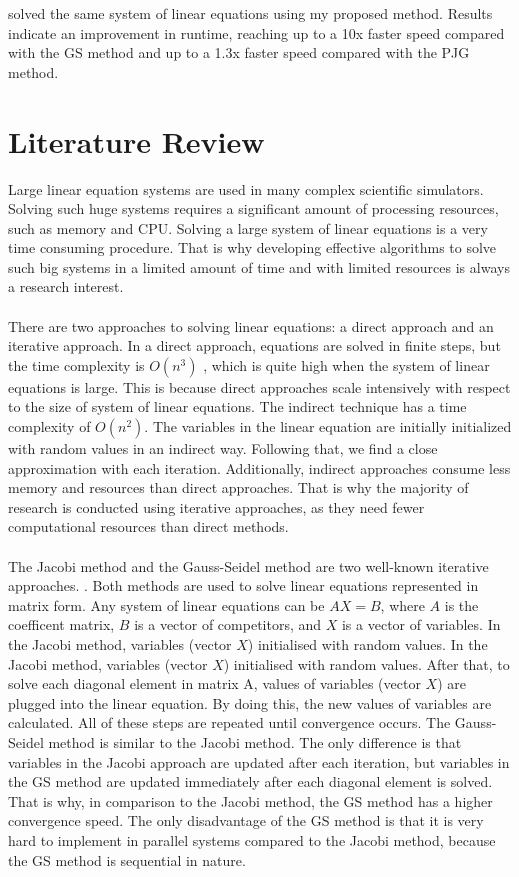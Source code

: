 \documentclass[11pt]{article}       %
\begin{document}
solved the same system of linear equations using my proposed method. Results indicate an improvement in runtime, reaching up to a 10x faster speed compared with the GS method and up to a 1.3x faster speed compared with the PJG method.


\section{Literature Review} \label{litrev}

Large linear equation systems are used in many complex scientific simulators. Solving such huge systems requires a significant amount of processing resources, such as memory and CPU. Solving a large system of linear equations is a very time consuming procedure. That is why developing effective algorithms to solve such big systems in a limited amount of time and with limited resources is always a research interest.
\\
\\
There are two approaches to solving linear equations: a direct approach and an iterative approach. In a direct approach,  equations are solved in finite steps, but the time complexity is $O(n^{3})$ \cite{numerical-mathematics}, which is quite high when the system of linear equations is large. This is because direct approaches scale intensively with respect to the size of system of linear equations. The indirect technique has a time complexity of $O(n^2)$. The variables in the linear equation are initially initialized with random values in an indirect way. Following that, we find a close approximation with each iteration. Additionally, indirect approaches consume less memory and resources than direct approaches. That is why the majority of research is conducted using iterative approaches, as they need fewer computational resources than direct methods.
\\
\\
The Jacobi method and the Gauss-Seidel method are two well-known iterative approaches. \cite{hageman2016applied}. Both methods are used to solve linear equations represented in matrix form. Any system of linear equations can be  $AX = B$, where $A$ is the coefficent matrix, $B$ is a vector of competitors, and $X$ is a vector of variables. In the Jacobi method, variables (vector $X$) initialised with random values. In the Jacobi method, variables (vector $X$) initialised with random values. After that, to solve each diagonal element in matrix A, values of variables (vector $X$) are plugged into the linear equation.  By doing this, the new values of variables are calculated.  All of these steps are repeated until convergence occurs. The   Gauss-Seidel method is similar to the Jacobi method. The only difference is that variables in the Jacobi approach are updated after each iteration, but variables in the GS method are updated immediately after each diagonal element is solved. That is why, in comparison to the Jacobi method, the GS method has a higher convergence speed. The only disadvantage of the GS method is that it is very hard to implement in parallel systems compared to the Jacobi method, because the GS method is sequential in nature.
\end{document}
